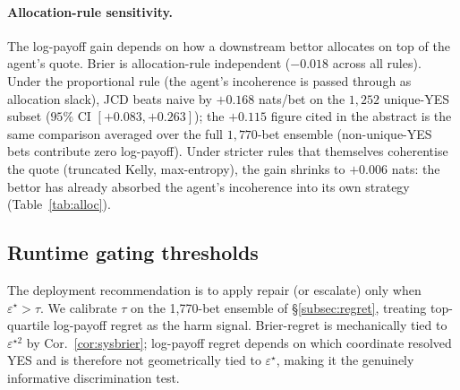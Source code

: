 \documentclass{article}
\theoremstyle{plain}
\theoremstyle{definition}
\theoremstyle{remark}
\newcommand{\eps}{\varepsilon}
\begin{document}
\begin{table}[h]
\centering
\small

\caption{\textbf{Mean realised regret stratifies by
$\eps^\star$ quartile.} $n_{Q_1}\!=\!0$ for the bottom-quartile
log-payoff column because all such bets have JCD$\equiv$naive.}
\label{tab:quartile}
\end{table}

\paragraph{Allocation-rule sensitivity.}
The log-payoff gain depends on how a downstream bettor allocates
on top of the agent's quote. Brier is allocation-rule independent
($-0.018$ across all rules). Under the proportional rule (the
agent's incoherence is passed through as allocation slack),
JCD beats naive by $+0.168$ nats/bet on the $1{,}252$ unique-YES
subset ($95\%$ CI $[+0.083, +0.263]$); the $+0.115$ figure cited
in the abstract is the same comparison averaged over the full
$1{,}770$-bet ensemble (non-unique-YES bets contribute zero
log-payoff). Under stricter rules that themselves coherentise
the quote (truncated Kelly, max-entropy), the gain shrinks to
$+0.006$ nats: the bettor has already absorbed the agent's
incoherence into its own strategy (Table~\ref{tab:alloc}).

\begin{table}[h]
\centering
\small

\caption{\textbf{JCD vs.\ naive log-payoff under three
allocation rules} ($n\!=\!1{,}252$ unique-YES bets; paired
bootstrap). Proportional is the clearest behavioural-harm
measure; Kelly and max-entropy themselves coherentise.}
\label{tab:alloc}
\end{table}

\subsection{Runtime gating thresholds}
\label{subsec:gate}

The deployment recommendation is to apply repair (or escalate)
only when $\eps^\star\!>\!\tau$. We calibrate $\tau$ on the
1,770-bet ensemble of \S\ref{subsec:regret}, treating top-quartile
log-payoff regret as the harm signal. Brier-regret is
mechanically tied to $\eps^{\star 2}$ by Cor.~\ref{cor:sysbrier};
log-payoff regret depends on which coordinate resolved YES and
is therefore not geometrically tied to $\eps^\star$, making it
the genuinely informative discrimination test.
\end{document}
